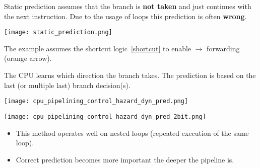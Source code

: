 Static prediction assumes that the branch is \textbf{not taken} and just continues with the next instruction. Due to the usage of loops this prediction is often \textbf{wrong}.
\begin{center}
    \texttt{[image: static\_prediction.png]}
\end{center}
The example assumes the shortcut logic~\ref{shortcut} to enable $\to$ forwarding (orange arrow).

\newpar{}

The CPU learns which direction the branch takes. The prediction is based on the last (or multiple last) branch decision(s). %
\begin{center}
    \texttt{[image: cpu\_pipelining\_control\_hazard\_dyn\_pred.png]}
\end{center}

\newpar{}
\begin{center}
    \texttt{[image: cpu\_pipelining\_control\_hazard\_dyn\_pred\_2bit.png]}
\end{center}

\begin{itemize}
    \item This method operates well on nested loops (repeated execution of the same loop).
    \item Correct prediction becomes more important the deeper the pipeline is.
\end{itemize}


